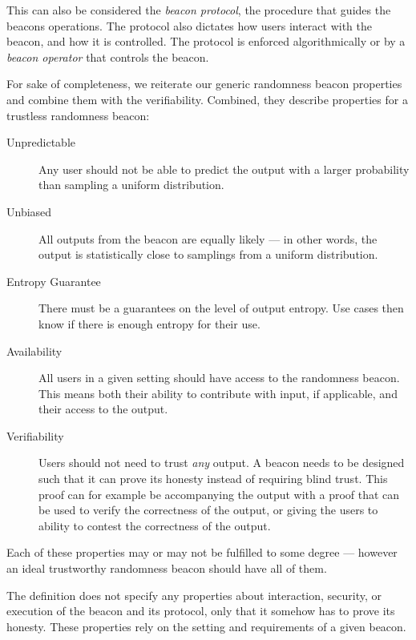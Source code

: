 This can also be considered the \emph{beacon protocol}, the procedure that guides the beacons operations. The protocol also dictates how users interact with the beacon, and how it is controlled. The protocol is enforced algorithmically or by a \emph{beacon operator} that controls the beacon.

For sake of completeness, we reiterate our generic randomness beacon properties and combine them with the verifiability. Combined, they describe properties for a trustless randomness beacon:

\begin{description}
    \item[Unpredictable]
        Any user should not be able to predict the output with a larger probability than sampling a uniform distribution.
    \item[Unbiased]
        All outputs from the beacon are equally likely --- in other words, the output is statistically close to samplings from a uniform distribution.
    \item[Entropy Guarantee]
		There must be a guarantees on the level of output entropy. Use cases then know if there is enough entropy for their use.
    \item[Availability]
        All users in a given setting should have access to the randomness beacon.
        This means both their ability to contribute with input, if applicable, and their access to the output.
    \item[Verifiability]
        Users should not need to trust \emph{any} output.
        A beacon needs to be designed such that it can prove its honesty instead of requiring blind trust.
        This proof can for example be accompanying the output with a proof that can be used to verify the correctness of the output, or giving the users to ability to contest the correctness of the output.
\end{description}

Each of these properties may or may not be fulfilled to some degree --- however an ideal trustworthy randomness beacon should have all of them.%


The definition does not specify any properties about interaction, security, or execution of the beacon and its protocol, only that it somehow has to prove its honesty.
These properties rely on the setting and requirements of a given beacon.
